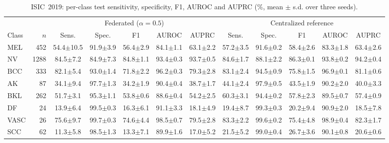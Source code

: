 \begin{table}[!t]
\caption{ISIC~2019: per-class test sensitivity, specificity, F1, AUROC and AUPRC (\%, mean $\pm$ s.d. over three seeds).}
\label{tab:19-perclass}
\centering
\footnotesize
\setlength{\tabcolsep}{3.2pt}
\begin{tabular}{lrcccccccccc}
\toprule
 & & \multicolumn{5}{c}{Federated ($\alpha{=}0.5$)} & \multicolumn{5}{c}{Centralized reference} \\
\cmidrule(lr){3-7}\cmidrule(lr){8-12}
Class & $n$ & Sens. & Spec. & F1 & AUROC & AUPRC & Sens. & Spec. & F1 & AUROC & AUPRC \\
\midrule
MEL & 452 & 54.4$\pm$10.5 & 91.9$\pm$3.9 & 56.4$\pm$2.9 & 84.1$\pm$1.1 & 63.1$\pm$2.2 & 57.2$\pm$3.5 & 91.6$\pm$0.2 & 58.4$\pm$2.6 & 83.3$\pm$1.8 & 63.4$\pm$2.6 \\
NV & 1288 & 84.5$\pm$7.2 & 84.9$\pm$7.3 & 84.8$\pm$1.1 & 93.4$\pm$0.3 & 93.7$\pm$0.5 & 84.6$\pm$1.7 & 88.1$\pm$2.2 & 86.3$\pm$0.1 & 93.8$\pm$0.2 & 94.2$\pm$0.4 \\
BCC & 333 & 82.1$\pm$5.4 & 93.0$\pm$1.4 & 71.8$\pm$2.2 & 96.2$\pm$0.3 & 79.3$\pm$2.8 & 83.1$\pm$2.4 & 94.5$\pm$0.9 & 75.8$\pm$1.5 & 96.9$\pm$0.1 & 81.1$\pm$0.6 \\
AK & 87 & 34.1$\pm$9.4 & 97.7$\pm$1.3 & 34.2$\pm$1.9 & 90.4$\pm$0.4 & 38.7$\pm$1.7 & 44.1$\pm$2.4 & 97.9$\pm$0.5 & 43.5$\pm$1.9 & 90.2$\pm$2.0 & 40.0$\pm$3.3 \\
BKL & 262 & 51.7$\pm$3.1 & 95.3$\pm$1.1 & 53.8$\pm$0.6 & 88.6$\pm$0.4 & 54.2$\pm$2.5 & 60.3$\pm$3.1 & 94.4$\pm$0.2 & 57.8$\pm$2.3 & 89.5$\pm$0.7 & 57.4$\pm$0.9 \\
DF & 24 & 13.9$\pm$6.4 & 99.5$\pm$0.3 & 16.3$\pm$6.1 & 91.1$\pm$3.3 & 18.1$\pm$4.9 & 19.4$\pm$8.7 & 99.3$\pm$0.3 & 20.2$\pm$9.4 & 90.9$\pm$2.0 & 18.5$\pm$7.8 \\
VASC & 26 & 75.6$\pm$9.7 & 99.7$\pm$0.3 & 74.6$\pm$4.4 & 98.5$\pm$0.7 & 79.5$\pm$2.8 & 83.3$\pm$2.2 & 99.6$\pm$0.2 & 75.4$\pm$4.8 & 98.9$\pm$0.4 & 82.3$\pm$1.7 \\
SCC & 62 & 11.3$\pm$5.8 & 98.5$\pm$1.3 & 13.3$\pm$7.1 & 89.9$\pm$1.6 & 17.0$\pm$5.2 & 21.5$\pm$5.2 & 99.0$\pm$0.4 & 26.7$\pm$3.6 & 90.1$\pm$0.8 & 20.6$\pm$0.6 \\
\bottomrule
\end{tabular}
\end{table}